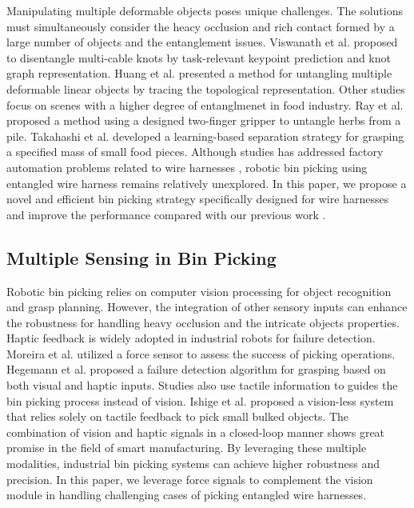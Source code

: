 \documentclass[letterpaper, 10 pt, conference]{ieeeconf}
\begin{document}
    Manipulating multiple deformable objects poses unique challenges. The solutions must simultaneously consider the heacy occlusion and rich contact formed by a large number of objects and the entanglement issues. Viswanath et al. \cite{viswanath2021disentangling} proposed to disentangle multi-cable knots by task-relevant keypoint prediction and knot graph representation. Huang et al. \cite{huang2023untangling} presented a method for untangling multiple deformable linear objects by tracing the topological representation. Other studies focus on scenes with a higher degree of entanglmenet in food industry. Ray et al. \cite{ray2020robotic} proposed a method using a designed two-finger gripper to untangle herbs from a pile. Takahashi et al. \cite{takahashi2021target} developed a learning-based separation strategy for grasping a specified mass of small food pieces. Although studies has addressed factory automation problems related to wire harnesses \cite{guo2022visual,jiang2011robotized,zhou2020practical}, robotic bin picking using entangled wire harness remains relatively unexplored. In this paper, we propose a novel and efficient bin picking strategy specifically designed for wire harnesses and improve the performance compared with our previous work \cite{zhang2022learning}. 




\subsection{Multiple Sensing in Bin Picking}

    Robotic bin picking relies on computer vision processing for object recognition and grasp planning. However, the integration of other sensory inputs can enhance the robustness for handling heavy occlusion and the intricate objects properties. Haptic feedback is widely adopted in industrial robots for failure detection. Moreira et al. \cite{moreira2016assessment} utilized a force sensor to assess the success of picking operations. Hegemann et al. \cite{hegemann2022learning} proposed a failure detection algorithm for grasping based on both visual and haptic inputs. Studies also use tactile information to guides the bin picking process instead of vision. Ishige et al. \cite{ishige2020blind} proposed a vision-less system that relies solely on tactile feedback to pick small bulked objects. The combination of vision and haptic signals in a closed-loop manner shows great promise in the field of smart manufacturing. By leveraging these multiple modalities, industrial bin picking systems can achieve higher robustness and precision. In this paper, we leverage force signals to complement the vision module in handling challenging cases of picking entangled wire harnesses.
\end{document}

